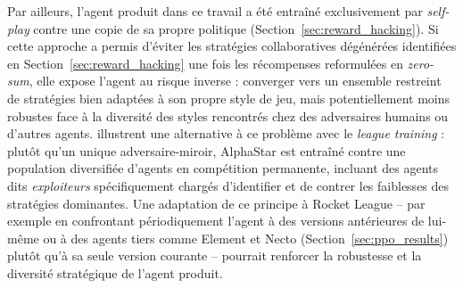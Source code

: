 Par ailleurs, l'agent produit dans ce travail a été entraîné exclusivement par \textit{self-play} contre une copie de sa propre politique (Section~\ref{sec:reward_hacking}). Si cette approche a permis d'éviter les stratégies collaboratives dégénérées identifiées en Section~\ref{sec:reward_hacking} 
une fois les récompenses reformulées en \textit{zero-sum}, elle expose l'agent au risque inverse : converger vers un ensemble restreint de stratégies bien adaptées à son propre style de jeu, mais potentiellement moins robustes face à la diversité des styles rencontrés chez des adversaires humains ou d'autres agents. \textcite{vinyalsGrandmasterLevelStarCraft2019} illustrent une 
alternative à ce problème avec le \textit{league training} : plutôt qu'un unique adversaire-miroir, AlphaStar est entraîné contre une population diversifiée d'agents en compétition permanente, incluant des agents dits \textit{exploiteurs} spécifiquement chargés d'identifier et de contrer les faiblesses des stratégies dominantes. Une adaptation de ce principe à Rocket League -- par 
exemple en confrontant périodiquement l'agent à des versions antérieures de lui-même ou à des agents tiers comme Element et Necto (Section~\ref{sec:ppo_results}) plutôt qu'à sa seule version courante -- pourrait renforcer la robustesse et la diversité stratégique de l'agent produit.